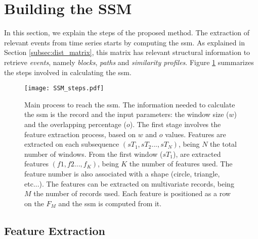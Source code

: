 

\section{Building the SSM}

In this section, we explain the steps of the proposed method. The extraction of relevant events from time series starts by computing the \gls{ssm}. As explained in Section \ref{subsec:dist_matrix}, this matrix has relevant structural information to retrieve \textit{events}, namely \textit{blocks}, \textit{paths} and \textit{similarity profiles}. Figure \ref{fig:SSM_scheme} summarizes the steps involved in calculating the \gls{ssm}.

\begin{figure}
\centering
    \texttt{[image: SSM\_steps.pdf]}
    \caption{Main process to reach the \gls{ssm}. The information needed to calculate the \gls{ssm} is the record and the input parameters: the window size ($w$) and the overlapping percentage ($o$). The first stage involves the feature extraction process, based on $w$ and $o$ values. Features are extracted on each subsequence $(sT_1, sT_2..., sT_N)$, being $N$ the total number of windows. From the first window ($sT_1$), are extracted features $(f1, f2..., f_K)$, being $K$ the number of features used. The feature number is also associated with a shape (circle, triangle, etc...). The features can be extracted on multivariate records, being $M$ the number of records used. Each feature is positioned as a row on the $F_M$ and the \gls{ssm} is computed from it.}
    \label{fig:SSM_scheme}
\end{figure}

\subsection{Feature Extraction}

